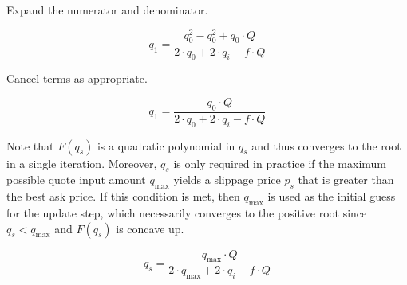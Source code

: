 Expand the numerator and denominator.

\begin{equation*}
	q_1 = \frac{q_0^2 - q_0^2 + q_0 \cdot Q}{2 \cdot q_0 + 2 \cdot q_i - f \cdot Q}
\end{equation*}

Cancel terms as appropriate.

\begin{equation*}
	q_1 = \frac{q_0 \cdot Q}{2 \cdot q_0 + 2 \cdot q_i - f \cdot Q}
\end{equation*}

Note that $F(q_s)$ is a quadratic polynomial in $q_s$ and thus converges to the root in
a single iteration. Moreover, $q_s$ is only required in practice if the maximum
possible quote input amount $q_{\max}$ yields a slippage price $p_s$ that is
greater than the best ask price. If this condition is met, then $q_{\max}$ is used
as the initial guess for the update step, which necessarily converges to the positive
root since $q_s < q_{\max}$ and $F(q_s)$ is concave up.

\begin{equation*}
	q_s = \frac{q_{\max} \cdot Q}{2 \cdot q_{\max} + 2 \cdot q_i - f \cdot Q}
\end{equation*}

